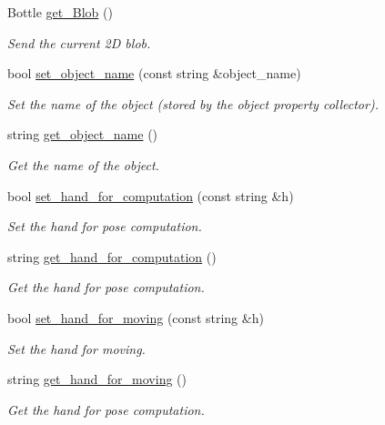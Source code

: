 \begin{DoxyCompactItemize}
\item 
Bottle \hyperlink{classGraspDemo_a4c953da01a507c3db576aceaa037ccf7}{get\+\_\+\+Blob} ()
\begin{DoxyCompactList}\small\item\em Send the current 2D blob. \end{DoxyCompactList}\item 
bool \hyperlink{classGraspDemo_a3d0c212259e9708f114c974f4f8be5d8}{set\+\_\+object\+\_\+name} (const string \&object\+\_\+name)
\begin{DoxyCompactList}\small\item\em Set the name of the object (stored by the object property collector). \end{DoxyCompactList}\item 
string \hyperlink{classGraspDemo_a0e63863ba87a3dfc2e431ef13d28b3b1}{get\+\_\+object\+\_\+name} ()
\begin{DoxyCompactList}\small\item\em Get the name of the object. \end{DoxyCompactList}\item 
bool \hyperlink{classGraspDemo_aba0999973563c9c351eced78c61c387c}{set\+\_\+hand\+\_\+for\+\_\+computation} (const string \&h)
\begin{DoxyCompactList}\small\item\em Set the hand for pose computation. \end{DoxyCompactList}\item 
string \hyperlink{classGraspDemo_a5a25b013010af2cefc14a7ee9537de8b}{get\+\_\+hand\+\_\+for\+\_\+computation} ()
\begin{DoxyCompactList}\small\item\em Get the hand for pose computation. \end{DoxyCompactList}\item 
bool \hyperlink{classGraspDemo_a8d98d43216ba591f3859c686b15174df}{set\+\_\+hand\+\_\+for\+\_\+moving} (const string \&h)
\begin{DoxyCompactList}\small\item\em Set the hand for moving. \end{DoxyCompactList}\item 
string \hyperlink{classGraspDemo_ad81dd2f4eb0d2e0f31faf4e23866395f}{get\+\_\+hand\+\_\+for\+\_\+moving} ()
\begin{DoxyCompactList}\small\item\em Get the hand for pose computation. \end{DoxyCompactList}\item 

\end{DoxyCompactItemize}
